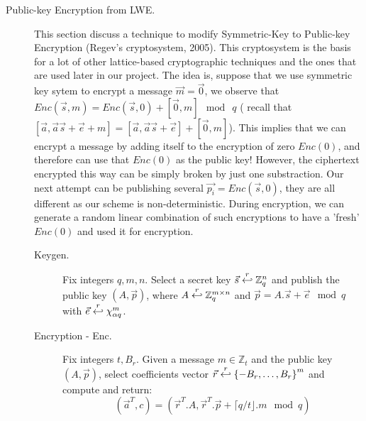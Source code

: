 \begin{description}
\begin{description}
\begin{description}
                    \end{description}


            \end{description}

        \item [Public-key Encryption from LWE.] This section discuss a
            technique to modify Symmetric-Key to Public-key Encryption
            (Regev's cryptosystem, 2005). This cryptosystem is the basis
            for a lot of other lattice-based cryptographic techniques and the
            ones that are used
            later in our project. The idea is,
            suppose that we use symmetric key sytem to encrypt a message
            $\vec{m} = \vec{0}$, we observe that $Enc(\vec{s}, m) =
            Enc(\vec{s},0) + [\vec{0}, m] \mod \ q$ ( recall that
                $[\vec{a}, \vec{a}\vec{s} + \vec{e} + m] = [\vec{a},
            \vec{a}\vec{s} + \vec{e}] + [\vec{0}, m]$). This implies
            that we can encrypt a message by adding itself to the
            encryption of zero $Enc(0)$, and therefore can use that
            $Enc(0)$ as the public key! However, the ciphertext encrypted this
            way can be simply
            broken by just one substraction. Our next attempt can be
            publishing several $\vec{p_i} = Enc(\vec{s}, 0)$, they are
            all different as our scheme is non-deterministic. During
            encryption, we can generate a random linear combination of
            such encryptions to have a 'fresh' $Enc(0)$ and used it for
            encryption.
            \begin{description}
                \item [Keygen.] Fix integers $q, m, n$. Select a secret key
                    $\vec{s} \stackrel{r}{\hookleftarrow} \mathbb{Z}_q^n$ and publish the
                    public key $(A,\vec{p})$, where $A \stackrel{r}{\hookleftarrow}
                    \mathbb{Z}_q^{m \times n}$ and $\vec{p} = A.\vec{s} +
                    \vec{e} \mod q$ with $\vec{e} \stackrel{r}{\hookleftarrow} \chi_{\alpha
                    q}^m$.
                \item [Encryption - Enc.] Fix integers $t, B_r$. Given a message
                    $m \in \mathbb{Z}_t$ and the public key $(A,\vec{p})$,
                    select coefficients vector $\vec{r} \stackrel{r}{\hookleftarrow} \left\{
                    -B_r, \dots, B_r \right\}^m$ and compute and return:
                    \[
                        (\vec{a}^T, c) = ( \vec{r}^T . A,  \vec{r}^T .
                        \vec{p} + \lceil q/t \rfloor . m \mod q)
\]
\end{description}
\end{description}

